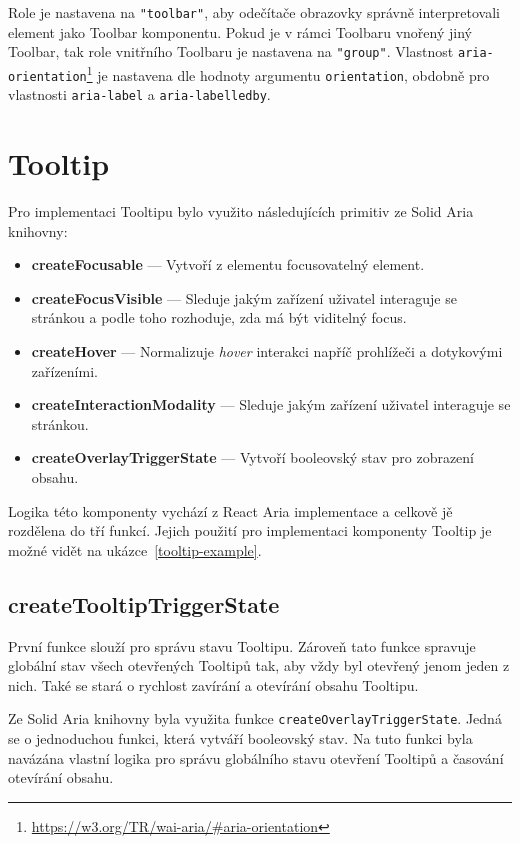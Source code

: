 Role je nastavena na \texttt{"toolbar"}, aby odečítače obrazovky správně interpretovali element jako Toolbar komponentu.
Pokud je v rámci Toolbaru vnořený jiný Toolbar, tak role vnitřního Toolbaru je nastavena na \texttt{"group"}.
Vlastnost \texttt{aria-orientation}\footnote{\url{https://w3.org/TR/wai-aria/\#aria-orientation}} je nastavena dle hodnoty argumentu \texttt{orientation}, obdobně pro vlastnosti \texttt{aria-label} a \texttt{aria-labelledby}.

\section{Tooltip}

Pro implementaci Tooltipu bylo využito následujících primitiv ze Solid Aria knihovny:

\begin{itemize}
    \item \textbf{createFocusable} --- Vytvoří z elementu focusovatelný element.
    \item \textbf{createFocusVisible} --- Sleduje jakým zařízení uživatel interaguje se stránkou a podle toho rozhoduje, zda má být viditelný focus.
    \item \textbf{createHover} --- Normalizuje \textit{hover} interakci napříč prohlížeči a dotykovými zařízeními.
    \item \textbf{createInteractionModality} --- Sleduje jakým zařízení uživatel interaguje se stránkou.
    \item \textbf{createOverlayTriggerState} --- Vytvoří booleovský stav pro zobrazení obsahu.
\end{itemize}

Logika této komponenty vychází z React Aria implementace a celkově jě rozdělena do tří funkcí.
Jejich použití pro implementaci komponenty Tooltip je možné vidět na ukázce~\ref{tooltip-example}.

\clearpage

\subsection{createTooltipTriggerState}

První funkce slouží pro správu stavu Tooltipu.
Zároveň tato funkce spravuje globální stav všech otevřených Tooltipů tak, aby vždy byl otevřený jenom jeden z nich.
Také se stará o rychlost zavírání a otevírání obsahu Tooltipu.

Ze Solid Aria knihovny byla využita funkce \texttt{createOverlayTriggerState}.
Jedná se o jednoduchou funkci, která vytváří booleovský stav.
Na tuto funkci byla navázána vlastní logika pro správu globálního stavu otevření Tooltipů a časování otevírání obsahu.

